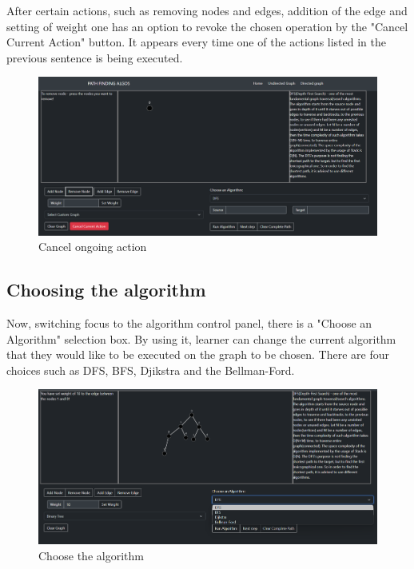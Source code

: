 After certain actions, such as removing nodes and edges, addition of the edge and setting of weight one has an option to revoke the chosen operation by the "Cancel Current Action" button. It appears every time one of the actions listed in the previous sentence is being executed.

\begin{figure}[H]
	\centering
	\includegraphics[width=\textwidth]{images/cancel_current_action.png}
	\caption{Cancel ongoing action}
\end{figure}

\subsection{Choosing the algorithm}

Now, switching focus to the algorithm control panel, there is a "Choose an Algorithm" selection box. By using it, learner can change the current algorithm that they would like to be executed on the graph to be chosen. There are four choices such as DFS, BFS, Djikstra and the Bellman-Ford. 

\begin{figure}[H]
	\centering
	\includegraphics[width=\textwidth]{images/choosing_the_algorithm.png}
	\caption{Choose the algorithm}
\end{figure}

